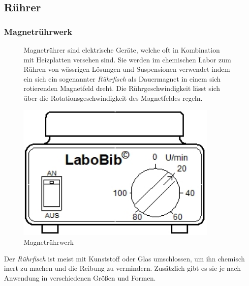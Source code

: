 \subsection{Rührer}
\subsubsection*{Magnetrührwerk}
\begin{figure}[h!]
	\begin{minipage}[t]{0.6\textwidth}
		\vspace{0pt}
		Magnetrührer sind elektrische Geräte, welche oft in Kombination mit Heizplatten versehen sind. Sie werden im chemischen Labor zum Rühren von wässrigen Lösungen und Suspensionen verwendet indem ein sich ein sogenannter \textit{Rührfisch} als Dauermagnet in einem sich rotierenden Magnetfeld dreht. Die Rührgeschwindigkeit lässt sich über die Rotationsgeschwindigkeit des Magnetfeldes regeln.
	\end{minipage}
	\hfill
	\hspace{1mm}
	\begin{minipage}[t]{0.35\textwidth}
		\vspace{0pt}
		\centering
		\includegraphics[width=0.88\textwidth]{img/magnetruehrer}
		\caption{Magnetrührwerk}
		\label{fig:magnetruehrwerk}
	\end{minipage}
\end{figure}
\FloatBarrier
	Der \textit{Rührfisch} ist meist mit Kunststoff oder Glas umschlossen, um ihn chemisch inert zu machen und die Reibung zu vermindern. Zusätzlich gibt es sie je nach Anwendung in verschiedenen Größen und Formen. 

\newpage


